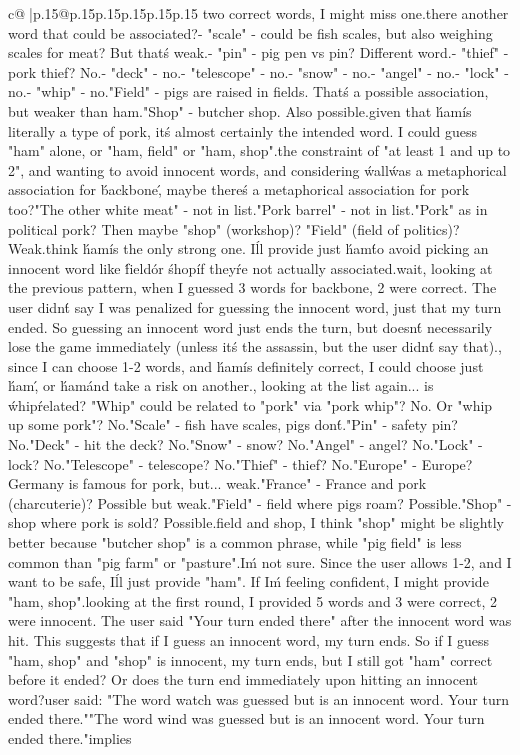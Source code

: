 \documentclass{article}
\begin{document}
{\begin{supertabular}{c@{$\;$}|p{.15\linewidth}@{}p{.15\linewidth}p{.15\linewidth}p{.15\linewidth}p{.15\linewidth}p{.15\linewidth}}
{{{two correct words, I might miss one.\n\nIs there another word that could be associated?\n- "scale" - could be fish scales, but also weighing scales for meat? But that\'s weak.\n- "pin" - pig pen vs pin? Different word.\n- "thief" - pork thief? No.\n- "deck" - no.\n- "telescope" - no.\n- "snow" - no.\n- "angel" - no.\n- "lock" - no.\n- "whip" - no.\n\n"Field" - pigs are raised in fields. That\'s a possible association, but weaker than ham.\n\n"Shop" - butcher shop. Also possible.\n\nBut given that \'ham\' is literally a type of pork, it\'s almost certainly the intended word. I could guess "ham" alone, or "ham, field" or "ham, shop".\n\nGiven the constraint of "at least 1 and up to 2", and wanting to avoid innocent words, and considering \'wall\' was a metaphorical association for \'backbone\', maybe there\'s a metaphorical association for pork too?\n\n"The other white meat" - not in list.\n"Pork barrel" - not in list.\n"Pork" as in political pork? Then maybe "shop" (workshop)? "Field" (field of politics)? Weak.\n\nI think \'ham\' is the only strong one. I\'ll provide just \'ham\' to avoid picking an innocent word like \'field\' or \'shop\' if they\'re not actually associated.\n\nBut wait, looking at the previous pattern, when I guessed 3 words for backbone, 2 were correct. The user didn\'t say I was penalized for guessing the innocent word, just that my turn ended. So guessing an innocent word just ends the turn, but doesn\'t necessarily lose the game immediately (unless it\'s the assassin, but the user didn\'t say that).\n\nHowever, since I can choose 1-2 words, and \'ham\' is definitely correct, I could choose just \'ham\', or \'ham\' and take a risk on another.\n\nActually, looking at the list again... is \'whip\' related? "Whip" could be related to "pork" via "pork whip"? No. Or "whip up some pork"? No.\n\n"Scale" - fish have scales, pigs don\'t.\n\n"Pin" - safety pin? No.\n\n"Deck" - hit the deck? No.\n\n"Snow" - snow? No.\n\n"Angel" - angel? No.\n\n"Lock" - lock? No.\n\n"Telescope" - telescope? No.\n\n"Thief" - thief? No.\n\n"Europe" - Europe? Germany is famous for pork, but... weak.\n\n"France" - France and pork (charcuterie)? Possible but weak.\n\n"Field" - field where pigs roam? Possible.\n\n"Shop" - shop where pork is sold? Possible.\n\nBetween field and shop, I think "shop" might be slightly better because "butcher shop" is a common phrase, while "pig field" is less common than "pig farm" or "pasture".\n\nBut I\'m not sure. Since the user allows 1-2, and I want to be safe, I\'ll just provide "ham". If I\'m feeling confident, I might provide "ham, shop".\n\nBut looking at the first round, I provided 5 words and 3 were correct, 2 were innocent. The user said "Your turn ended there" after the innocent word was hit. This suggests that if I guess an innocent word, my turn ends. So if I guess "ham, shop" and "shop" is innocent, my turn ends, but I still got "ham" correct before it ended? Or does the turn end immediately upon hitting an innocent word?\n\nThe user said: "The word watch was guessed but is an innocent word. Your turn ended there."\nAnd "The word wind was guessed but is an innocent word. Your turn ended there."\n\nThis implies }}}
\end{supertabular}}
\end{document}
